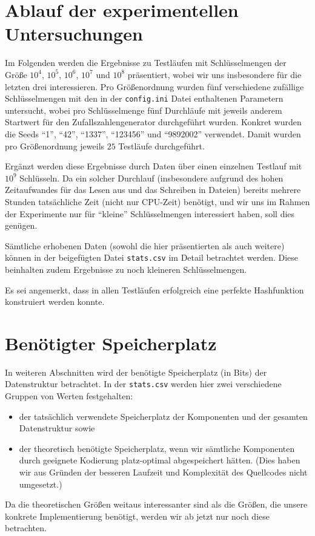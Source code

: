 \documentclass[a4paper,12pt,twoside]{report}
\begin{document}
\section{Ablauf der experimentellen Untersuchungen}
\label{sec:experimentelleUntersuchungen}

Im Folgenden werden die Ergebnisse zu Testläufen mit Schlüsselmengen der Größe $10^4$, $10^5$, $10^6$, $10^7$ und $10^8$ präsentiert, wobei wir uns insbesondere für die letzten drei interessieren.
Pro Größenordnung wurden fünf verschiedene zufällige Schlüsselmengen mit den in der \texttt{config.ini} Datei enthaltenen Parametern untersucht, wobei pro Schlüsselmenge fünf Durchläufe mit jeweils anderem Startwert für den Zufallszahlengenerator durchgeführt wurden.
Konkret wurden die Seeds ``1'', ``42'', ``1337'', ``123456'' und ``9892002'' verwendet. Damit wurden pro Größenordnung jeweils $25$ Testläufe durchgeführt.

Ergänzt werden diese Ergebnisse durch Daten über einen einzelnen Testlauf mit $10^9$ Schlüsseln.
Da ein solcher Durchlauf (insbesondere aufgrund des hohen Zeitaufwandes für das Lesen aus und das Schreiben in Dateien) bereits mehrere Stunden tatsächliche Zeit (nicht nur CPU-Zeit) benötigt, und wir uns im Rahmen der Experimente nur für ``kleine'' Schlüsselmengen interessiert haben, soll dies genügen.

Sämtliche erhobenen Daten (sowohl die hier präsentierten als auch weitere) können in der beigefügten Datei \texttt{stats.csv} im Detail betrachtet werden.
Diese beinhalten zudem Ergebnisse zu noch kleineren Schlüsselmengen.

Es sei angemerkt, dass in allen Testläufen erfolgreich eine perfekte Hashfunktion konstruiert werden konnte.

\section{Benötigter Speicherplatz}
\label{sec:speicherplatz}

In weiteren Abschnitten wird der benötigte Speicherplatz (in Bits) der Datenstruktur betrachtet. In der \texttt{stats.csv} werden hier zwei verschiedene Gruppen von Werten festgehalten:
\begin{itemize}
 \item der tatsächlich verwendete Speicherplatz der Komponenten und der gesamten Datenstruktur sowie
 \item der theoretisch benötigte Speicherplatz, wenn wir sämtliche Komponenten durch geeignete Kodierung platz-optimal abgespeichert hätten. (Dies haben wir aus Gründen der besseren Laufzeit und Komplexität des Quellcodes nicht umgesetzt.)
\end{itemize}
Da die theoretischen Größen weitaus interessanter sind als die Größen, die unsere konkrete Implementierung benötigt, werden wir ab jetzt nur noch diese betrachten.
\end{document}
